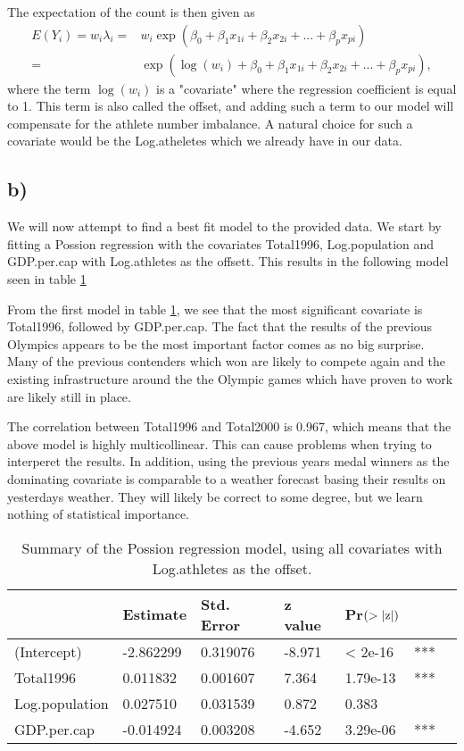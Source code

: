 \documentclass[a4paper, 10pt, reqno]{amsart}
\begin{document}
The expectation of the count is then given as 
\begin{align}
    E(Y_i) = w_i \lambda_i = & w_i \exp(\beta_0 + \beta_1 x_{1i} +\beta_2 x_{2i} + ... + \beta_p x_{pi})\\
    = & \exp(\log(w_i) +\beta_0 + \beta_1 x_{1i} +\beta_2 x_{2i} + ... + \beta_p x_{pi}),
\end{align}
where the term $\log(w_i)$ is a "covariate" where the regression coefficient is equal to 1. This term is also called the offset, and adding such a term to our model will compensate for the athlete number imbalance. A natural choice for such a covariate would be the Log.atheletes which we already have in our data.

\subsection{b)}
We will now attempt to find a best fit model to the provided data. We start by fitting a Possion regression with the covariates Total1996, Log.population and GDP.per.cap with Log.athletes as the offsett. This results in the following model seen in table \ref{tab: 5}

From the first model in table \ref{tab: 5}, we see that the most significant covariate is Total1996, followed by GDP.per.cap. The fact that the results of the previous Olympics appears to be the most important factor comes as no big surprise. Many of the previous contenders which won are likely to compete again and the existing infrastructure around the the Olympic games which have proven to work are likely still in place.

The correlation between Total1996 and Total2000 is 0.967, which means that the above model is highly multicollinear. This can cause problems when trying to interperet the results. In addition, using the previous years medal winners as the dominating covariate is comparable to a weather forecast basing their results on yesterdays weather. They will likely be correct to some degree, but we learn nothing of statistical importance. 

\begin{table}
\caption{Summary of the Possion regression model, using all covariates with Log.athletes as the offset.}
\label{tab: 5}
\begin{tabular}{lllllll}
\hline\hline
 & Estimate  & Std. Error & z value & Pr$(>\abs{\mathrm{z}})$ & \\ \hline
(Intercept)  &  -2.862299 &  0.319076 & -8.971 & < 2e-16& ***\\
Total1996      & 0.011832 &  0.001607 &  7.364& 1.79e-13 &***\\
Log.population & 0.027510 &  0.031539   &0.872 &   0.383 &   \\
GDP.per.cap   & -0.014924 &  0.003208 & -4.652& 3.29e-06 &***\\
\hline
\end{tabular}
\end{table}
\end{document}

